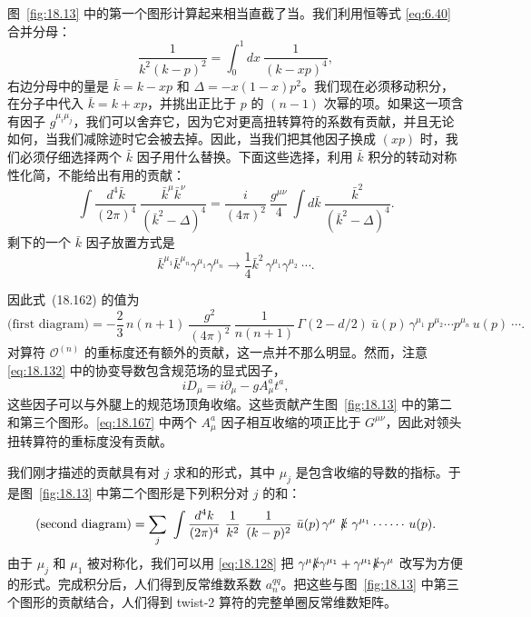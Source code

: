 图~\ref{fig:18.13} 中的第一个图形计算起来相当直截了当。我们利用恒等式 \eqref{eq:6.40} 合并分母：
\begin{equation}
  \frac{1}{k^2(k-p)^2} = \int_0^1 dx\ \frac{1}{(k-xp)^4} ,
  \label{eq:18.163}
\end{equation}
右边分母中的量是 $\bar{k} = k - xp$ 和 $\Delta = -x(1-x)p^2$。我们现在必须移动积分，在分子中代入 $\bar{k} = k + xp$，并挑出正比于 $p$ 的 $(n-1)$ 次幂的项。如果这一项含有因子 $g^{\mu_i\mu_j}$，我们可以舍弃它，因为它对更高扭转算符的系数有贡献，并且无论如何，当我们减除迹时它会被去掉。因此，当我们把其他因子换成 $(xp)$ 时，我们必须仔细选择两个 $\bar{k}$ 因子用什么替换。下面这些选择，利用 $\bar{k}$ 积分的转动对称性化简，不能给出有用的贡献：
\begin{equation}
  \int \frac{d^4\bar{k}}{(2\pi)^4}\ \frac{\bar{k}^\mu\bar{k}^\nu}
    {(\bar{k}^2-\Delta)^4} = \frac{i}{(4\pi)^2}\ \frac{g^{\mu\nu}}{4}\
      \int d\bar{k}\ \frac{\bar{k}^2}{(\bar{k}^2-\Delta)^4} .
  \label{eq:18.164}
\end{equation}
剩下的一个 $\bar{k}$ 因子放置方式是
\begin{equation}
  \bar{k}^{\mu_1}\bar{k}^{\mu_n}\gamma^{\mu_1}\gamma^{\mu_n}
  \to \frac{1}{4}\bar{k}^2\,\gamma^{\mu_1}\gamma^{\mu_2}\ \cdots .
  \label{eq:18.165}
\end{equation}

因此式~(18.162) 的值为
\begin{equation}
  \text{(first diagram)} = -\frac{2}{3}\,n(n+1)\ \frac{g^2}{(4\pi)^2}\
    \frac{1}{n(n+1)}\,\Gamma(2-d/2)\ \bar{u}(p)\,\gamma^{\mu_1}\,p^{\mu_2}
    \cdots p^{\mu_n}\,u(p)\ \cdots .
  \label{eq:18.166}
\end{equation}
对算符 $\mathcal{O}^{(n)}$ 的重标度还有额外的贡献，这一点并不那么明显。然而，注意 \eqref{eq:18.132} 中的协变导数包含规范场的显式因子，
\begin{equation}
  iD_\mu = i\partial_\mu - gA^a_\mu t^a ,
  \label{eq:18.167}
\end{equation}
这些因子可以与外腿上的规范场顶角收缩。这些贡献产生图~\ref{fig:18.13} 中的第二和第三个图形。\eqref{eq:18.167} 中两个 $A^a_\mu$ 因子相互收缩的项正比于 $G^{\mu\nu}$，因此对领头扭转算符的重标度没有贡献。

我们刚才描述的贡献具有对 $j$ 求和的形式，其中 $\mu_j$ 是包含收缩的导数的指标。于是图~\ref{fig:18.13} 中第二个图形是下列积分对 $j$ 的和：
\begin{equation}
  \text{(second diagram)} = \sum_j\ \int \frac{d^4k}{(2\pi)^4}\ \frac{1}{k^2}
    \ \frac{1}{(k-p)^2}\ \bar{u}(p)\,\gamma^\mu\ \slashed{k}\ \gamma^{\mu_1}
    \cdots \cdots \,u(p) .
  \label{eq:18.168}
\end{equation}
由于 $\mu_j$ 和 $\mu_1$ 被对称化，我们可以用 \eqref{eq:18.128} 把 $\gamma^\mu\slashed{k}\gamma^{\mu_1} + \gamma^{\mu_1}\slashed{k}\gamma^\mu$ 改写为方便的形式。完成积分后，人们得到反常维数系数 $a_n^{qq}$。把这些与图~\ref{fig:18.13} 中第三个图形的贡献结合，人们得到 twist-2 算符的完整单圈反常维数矩阵。


